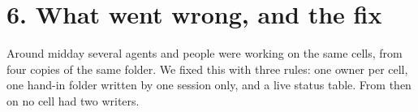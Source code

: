 \documentclass[10pt]{article}
\begin{document}
\section*{6. What went wrong, and the fix}
Around midday several agents and people were working on the same cells, from four copies of the same folder. We fixed this with three rules: one owner per cell, one hand-in folder written by one session only, and a live status table. From then on no cell had two writers.
\end{document}
